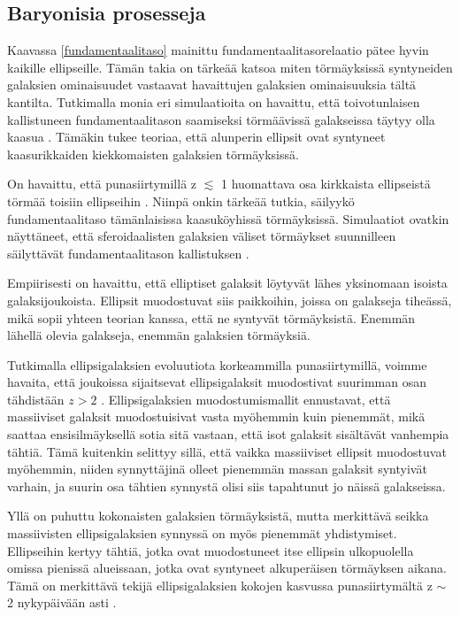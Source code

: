 \documentclass[12pt,a4paper]{article}
\begin{document}
\subsection{Baryonisia prosesseja}

Kaavassa \ref{fundamentaalitaso} mainittu fundamentaalitasorelaatio pätee hyvin kaikille ellipseille. Tämän takia on tärkeää katsoa miten törmäyksissä syntyneiden galaksien ominaisuudet vastaavat havaittujen galaksien ominaisuuksia tältä kantilta. Tutkimalla monia eri simulaatioita on havaittu, että toivotunlaisen kallistuneen fundamentaalitason saamiseksi törmäävissä galakseissa täytyy olla kaasua \citep{robertson:2006}. Tämäkin tukee teoriaa, että alunperin ellipsit ovat syntyneet kaasurikkaiden kiekkomaisten galaksien törmäyksissä. 

On havaittu, että punasiirtymillä z $\lesssim$ 1 huomattava osa kirkkaista ellipseistä törmää toisiin ellipseihin \citep{dokkum:2005, bell:2006, mcintosh:2008}. Niinpä onkin tärkeää tutkia, säilyykö fundamentaalitaso tämänlaisissa kaasuköyhissä törmäyksissä. Simulaatiot ovatkin näyttäneet, että sferoidaalisten galaksien väliset törmäykset suunnilleen säilyttävät fundamentaalitason kallistuksen \citep{nipoti:2003, boylan:2005, robertson:2006}.

Empiirisesti on havaittu, että elliptiset galaksit löytyvät lähes yksinomaan isoista galaksijoukoista. Ellipsit muodostuvat siis paikkoihin, joissa on galakseja tiheässä, mikä sopii yhteen teorian kanssa, että ne syntyvät törmäyksistä. Enemmän lähellä olevia galakseja, enemmän galaksien törmäyksiä.

Tutkimalla ellipsigalaksien evoluutiota korkeammilla punasiirtymillä, voimme havaita, että joukoissa sijaitsevat ellipsigalaksit muodostivat suurimman osan tähdistään $z > 2$ \citep{aragon:1993, rakos:1995, ellis:1997, schade:1997, stanford:1998}. Ellipsigalaksien muodostumismallit ennustavat, että massiiviset galaksit muodostuisivat vasta myöhemmin kuin pienemmät, mikä saattaa ensisilmäyksellä sotia sitä vastaan, että isot galaksit sisältävät vanhempia tähtiä. Tämä kuitenkin selittyy sillä, että vaikka massiiviset ellipsit muodostuvat myöhemmin, niiden synnyttäjinä olleet pienemmän massan galaksit syntyivät varhain, ja suurin osa tähtien synnystä olisi siis tapahtunut jo näissä galakseissa.

Yllä on puhuttu kokonaisten galaksien törmäyksistä, mutta merkittävä seikka massiivisten ellipsigalaksien synnyssä on myös pienemmät yhdistymiset. Ellipseihin kertyy tähtiä, jotka ovat muodostuneet itse ellipsin ulkopuolella omissa pienissä alueissaan, jotka ovat syntyneet alkuperäisen törmäyksen aikana. Tämä on merkittävä tekijä ellipsigalaksien kokojen kasvussa punasiirtymältä z $\sim$ 2 nykypäivään asti \citep{naab:2009, johansson:2012}.
\end{document}
